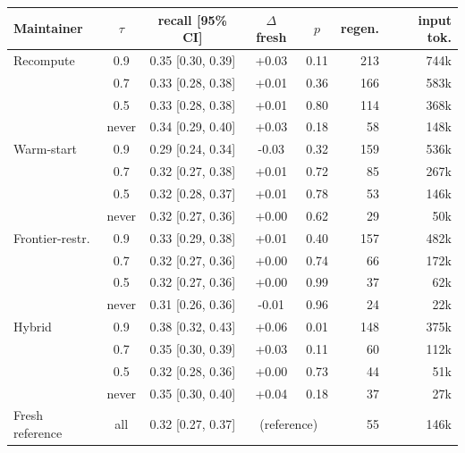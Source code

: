 \begin{tabular}{l c c c c r r}
\toprule
Maintainer & $\tau$ & recall [95\% CI] & $\Delta$ fresh & $p$ & regen. & input tok.\\
\midrule
Recompute & 0.9 & 0.35 [0.30, 0.39] & +0.03 & 0.11 & 213 & 744k \\
 & 0.7 & 0.33 [0.28, 0.38] & +0.01 & 0.36 & 166 & 583k \\
 & 0.5 & 0.33 [0.28, 0.38] & +0.01 & 0.80 & 114 & 368k \\
 & never & 0.34 [0.29, 0.40] & +0.03 & 0.18 & 58 & 148k \\
Warm-start & 0.9 & 0.29 [0.24, 0.34] & -0.03 & 0.32 & 159 & 536k \\
 & 0.7 & 0.32 [0.27, 0.38] & +0.01 & 0.72 & 85 & 267k \\
 & 0.5 & 0.32 [0.28, 0.37] & +0.01 & 0.78 & 53 & 146k \\
 & never & 0.32 [0.27, 0.36] & +0.00 & 0.62 & 29 & 50k \\
Frontier-restr. & 0.9 & 0.33 [0.29, 0.38] & +0.01 & 0.40 & 157 & 482k \\
 & 0.7 & 0.32 [0.27, 0.36] & +0.00 & 0.74 & 66 & 172k \\
 & 0.5 & 0.32 [0.27, 0.36] & +0.00 & 0.99 & 37 & 62k \\
 & never & 0.31 [0.26, 0.36] & -0.01 & 0.96 & 24 & 22k \\
Hybrid & 0.9 & 0.38 [0.32, 0.43] & +0.06 & 0.01 & 148 & 375k \\
 & 0.7 & 0.35 [0.30, 0.39] & +0.03 & 0.11 & 60 & 112k \\
 & 0.5 & 0.32 [0.28, 0.36] & +0.00 & 0.73 & 44 & 51k \\
 & never & 0.35 [0.30, 0.40] & +0.04 & 0.18 & 37 & 27k \\
\midrule
Fresh reference & all & 0.32 [0.27, 0.37] & \multicolumn{2}{c}{(reference)} & 55 & 146k\\
\bottomrule
\end{tabular}
